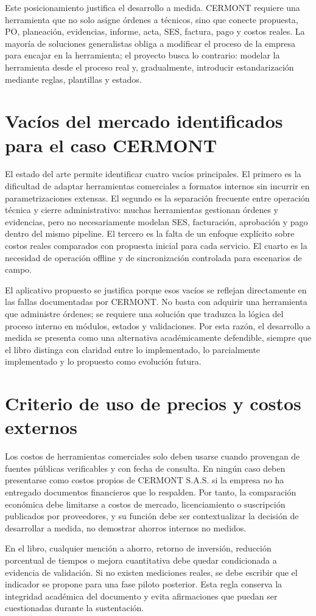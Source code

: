Este posicionamiento justifica el desarrollo a medida. CERMONT requiere una herramienta que no solo asigne órdenes a técnicos, sino que conecte propuesta, PO, planeación, evidencias, informe, acta, SES, factura, pago y costos reales. La mayoría de soluciones generalistas obliga a modificar el proceso de la empresa para encajar en la herramienta; el proyecto busca lo contrario: modelar la herramienta desde el proceso real y, gradualmente, introducir estandarización mediante reglas, plantillas y estados.

\section{Vacíos del mercado identificados para el caso CERMONT}
\label{sec:vacios-mercado-cermont}

El estado del arte permite identificar cuatro vacíos principales. El primero es la dificultad de adaptar herramientas comerciales a formatos internos sin incurrir en parametrizaciones extensas. El segundo es la separación frecuente entre operación técnica y cierre administrativo: muchas herramientas gestionan órdenes y evidencias, pero no necesariamente modelan SES, facturación, aprobación y pago dentro del mismo pipeline. El tercero es la falta de un enfoque explícito sobre costos reales comparados con propuesta inicial para cada servicio. El cuarto es la necesidad de operación offline y de sincronización controlada para escenarios de campo.

El aplicativo propuesto se justifica porque esos vacíos se reflejan directamente en las fallas documentadas por CERMONT. No basta con adquirir una herramienta que administre órdenes; se requiere una solución que traduzca la lógica del proceso interno en módulos, estados y validaciones. Por esta razón, el desarrollo a medida se presenta como una alternativa académicamente defendible, siempre que el libro distinga con claridad entre lo implementado, lo parcialmente implementado y lo propuesto como evolución futura.

\section{Criterio de uso de precios y costos externos}
\label{sec:criterio-precios-costos-externos}

Los costos de herramientas comerciales solo deben usarse cuando provengan de fuentes públicas verificables y con fecha de consulta. En ningún caso deben presentarse como costos propios de CERMONT S.A.S. si la empresa no ha entregado documentos financieros que lo respalden. Por tanto, la comparación económica debe limitarse a costos de mercado, licenciamiento o suscripción publicados por proveedores, y su función debe ser contextualizar la decisión de desarrollar a medida, no demostrar ahorros internos no medidos.

En el libro, cualquier mención a ahorro, retorno de inversión, reducción porcentual de tiempos o mejora cuantitativa debe quedar condicionada a evidencia de validación. Si no existen mediciones reales, se debe escribir que el indicador se propone para una fase piloto posterior. Esta regla conserva la integridad académica del documento y evita afirmaciones que puedan ser cuestionadas durante la sustentación.
